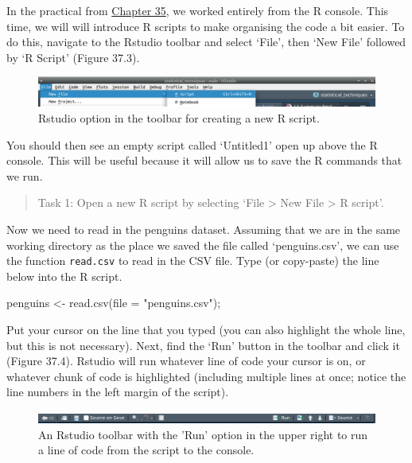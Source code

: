 \documentclass[
]{scrbook}
\newenvironment{Shaded}{\begin{snugshade}}{\end{snugshade}}
\newcommand{\AttributeTok}[1]{\textcolor[rgb]{0.77,0.63,0.00}{#1}}
\newcommand{\FunctionTok}[1]{\textcolor[rgb]{0.00,0.00,0.00}{#1}}
\newcommand{\NormalTok}[1]{#1}
\newcommand{\OtherTok}[1]{\textcolor[rgb]{0.56,0.35,0.01}{#1}}
\newcommand{\StringTok}[1]{\textcolor[rgb]{0.31,0.60,0.02}{#1}}
\begin{document}
In the practical from \protect\hyperlink{Chapter_35}{Chapter 35}, we worked entirely from the R console.
This time, we will will introduce R scripts to make organising the code a bit easier.
To do this, navigate to the Rstudio toolbar and select `File', then `New File' followed by `R Script' (Figure 37.3).

\begin{figure}
\includegraphics[width=1\linewidth]{img/Rstudio_script} \caption{Rstudio option in the toolbar for creating a new R script.}\label{fig:unnamed-chunk-219}
\end{figure}

You should then see an empty script called `Untitled1' open up above the R console.
This will be useful because it will allow us to save the R commands that we run.

\begin{quote}
Task 1: Open a new R script by selecting `File \textgreater{} New File \textgreater{} R script'.
\end{quote}

Now we need to read in the penguins dataset.
Assuming that we are in the same working directory as the place we saved the file called `penguins.csv', we can use the function \texttt{read.csv} to read in the CSV file.
Type (or copy-paste) the line below into the R script.

\begin{Shaded}
\begin{Highlighting}[]
\NormalTok{penguins }\OtherTok{\textless{}{-}} \FunctionTok{read.csv}\NormalTok{(}\AttributeTok{file =} \StringTok{"penguins.csv"}\NormalTok{);}
\end{Highlighting}
\end{Shaded}

Put your cursor on the line that you typed (you can also highlight the whole line, but this is not necessary).
Next, find the `Run' button in the toolbar and click it (Figure 37.4).
Rstudio will run whatever line of code your cursor is on, or whatever chunk of code is highlighted (including multiple lines at once; notice the line numbers in the left margin of the script).

\begin{figure}
\includegraphics[width=1\linewidth]{img/Rstudio_run} \caption{An Rstudio toolbar with the 'Run' option in the upper right to run a line of code from the script to the console.}\label{fig:unnamed-chunk-222}
\end{figure}
\end{document}
